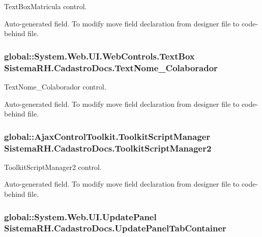 TextBoxMatricula control. 

Auto-\/generated field. To modify move field declaration from designer file to code-\/behind file. \hypertarget{class_sistema_r_h_1_1_cadastro_docs_a7aed86a72a29957d9e59a7d7a66eddf0}{
\subsubsection[{TextNome\_\-Colaborador}]{\setlength{\rightskip}{0pt plus 5cm}global::System.Web.UI.WebControls.TextBox {\bf SistemaRH.CadastroDocs.TextNome\_\-Colaborador}}}
\label{class_sistema_r_h_1_1_cadastro_docs_a7aed86a72a29957d9e59a7d7a66eddf0}


TextNome\_\-Colaborador control. 

Auto-\/generated field. To modify move field declaration from designer file to code-\/behind file. \hypertarget{class_sistema_r_h_1_1_cadastro_docs_a922507dd551a40cf6df9d74191dbe1f7}{
\subsubsection[{ToolkitScriptManager2}]{\setlength{\rightskip}{0pt plus 5cm}global::AjaxControlToolkit.ToolkitScriptManager {\bf SistemaRH.CadastroDocs.ToolkitScriptManager2}}}
\label{class_sistema_r_h_1_1_cadastro_docs_a922507dd551a40cf6df9d74191dbe1f7}


ToolkitScriptManager2 control. 

Auto-\/generated field. To modify move field declaration from designer file to code-\/behind file. \hypertarget{class_sistema_r_h_1_1_cadastro_docs_a2f0aad0f94f3bdc6c1047f6fc2509544}{
\subsubsection[{UpdatePanelTabContainer}]{\setlength{\rightskip}{0pt plus 5cm}global::System.Web.UI.UpdatePanel {\bf SistemaRH.CadastroDocs.UpdatePanelTabContainer}}}
\label{class_sistema_r_h_1_1_cadastro_docs_a2f0aad0f94f3bdc6c1047f6fc2509544}



